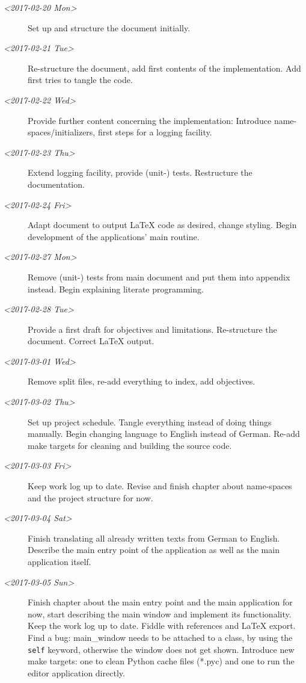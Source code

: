 \documentclass[10pt, openright, notitlepage]{scrreprt}
\begin{document}
\begin{description}
\item[{\textit{<2017-02-20 Mon>}}] Set up and structure the document initially.

\item[{\textit{<2017-02-21 Tue>}}] Re-structure the document, add first contents of the
implementation. Add first tries to tangle the code.

\item[{\textit{<2017-02-22 Wed>}}] Provide further content concerning the implementation:
Introduce name-spaces/initializers, first steps for a logging facility.

\item[{\textit{<2017-02-23 Thu>}}] Extend logging facility, provide (unit-) tests.
Restructure the documentation.

\item[{\textit{<2017-02-24 Fri>}}] Adapt document to output \LaTeX{} code as desired, change
styling. Begin development of the applications' main routine.

\item[{\textit{<2017-02-27 Mon>}}] Remove (unit-) tests from main document and put them into
appendix instead. Begin explaining literate programming.

\item[{\textit{<2017-02-28 Tue>}}] Provide a first draft for objectives and limitations.
Re-structure the document. Correct \LaTeX{} output.

\item[{\textit{<2017-03-01 Wed>}}] Remove split files, re-add everything to index, add
objectives.

\item[{\textit{<2017-03-02 Thu>}}] Set up project schedule. Tangle everything instead of
doing things manually. Begin changing language to English instead of German.
Re-add make targets for cleaning and building the source code.

\item[{\textit{<2017-03-03 Fri>}}] Keep work log up to date. Revise and finish chapter about
name-spaces and the project structure for now.

\item[{\textit{<2017-03-04 Sat>}}] Finish translating all already written texts from German
to English. Describe the main entry point of the application as well as the
main application itself.

\item[{\textit{<2017-03-05 Sun>}}] Finish chapter about the main entry point and the main
application for now, start describing the main window and implement its
functionality. Keep the work log up to date. Fiddle with references and
\LaTeX{} export. Find a bug: main\_window needs to be attached to a class, by
using the \texttt{self} keyword, otherwise the window does not get shown.
Introduce new make targets: one to clean Python cache files (*.pyc) and one
to run the editor application directly.


\end{description}
\end{document}
